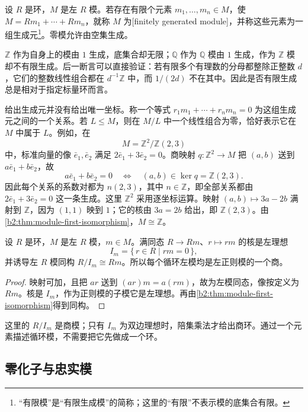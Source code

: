 \begin{definition}\label{b2:def:finitely-generated-module}
	设 \(R\) 是环，\(M\) 是左 \(R\) 模。若存在有限个元素 \(m_1,\ldots,m_n\in M\)，使 \(M=Rm_1+\cdots+Rm_n\)，就称 \(M\) 为[finitely generated module]，并称这些元素为一组生成元\footnote{“有限模”是“有限生成模”的简称；这里的“有限”不表示模的底集合有限。}。零模允许由空集生成。
\end{definition}

\(\mathbb Z\) 作为自身上的模由 \(1\) 生成，底集合却无限；\(\mathbb Q\) 作为 \(\mathbb Q\) 模由 \(1\) 生成，作为 \(\mathbb Z\) 模却不有限生成。后一断言可以直接验证：若有限多个有理数的分母都整除正整数 \(d\)，它们的整数线性组合都在 \(d^{-1}\mathbb Z\) 中，而 \(1/(2d)\) 不在其中。因此是否有限生成总是相对于指定标量环而言。

\ProseParagraphBreak
给出生成元并没有给出唯一坐标。称一个等式 \(r_1m_1+\cdots+r_nm_n=0\) 为这组生成元之间的一个关系。若 \(L\le M\)，则在 \(M/L\) 中一个线性组合为零，恰好表示它在 \(M\) 中属于 \(L\)。例如，在
\[
	M=\mathbb Z^2/\mathbb Z(2,3)
\]
中，标准向量的像 \(\bar e_1,\bar e_2\) 满足 \(2\bar e_1+3\bar e_2=0\)。商映射 \(q:\mathbb Z^2\to M\) 把 \((a,b)\) 送到 \(a\bar e_1+b\bar e_2\)，故
\[
	a\bar e_1+b\bar e_2=0 \quad\Longleftrightarrow\quad (a,b)\in\ker q=\mathbb Z(2,3).
\]
因此每个关系的系数对都为 \(n(2,3)\)，其中 \(n\in\mathbb Z\)，即全部关系都由 \(2\bar e_1+3\bar e_2=0\) 这一条生成。这里 \(\mathbb Z^2\) 采用逐坐标运算。映射 \((a,b)\mapsto3a-2b\) 满射到 \(\mathbb Z\)，因为 \((1,1)\) 映到 \(1\)；它的核由 \(3a=2b\) 给出，即 \(\mathbb Z(2,3)\)。由\cref{b2:thm:module-first-isomorphism}，\(M\cong\mathbb Z\)。

\begin{proposition}\label{b2:prop:cyclic-module-quotient}
	设 \(R\) 是环，\(M\) 是左 \(R\) 模，\(m\in M\)。满同态 \(R\to Rm\)、\(r\mapsto rm\) 的核是左理想
	\[
		I_m=\{\,r\in R\mid rm=0\,\},
	\]
	并诱导左 \(R\) 模同构 \(R/I_m\cong Rm\)。所以每个循环左模均是左正则模的一个商。
\end{proposition}
\begin{proof}
	映射可加，且把 \(ar\) 送到 \((ar)m=a(rm)\)，故为左模同态，像按定义为 \(Rm\)。核是 \(I_m\)，作为正则模的子模它是左理想。再由\cref{b2:thm:module-first-isomorphism}得到同构。
\end{proof}

这里的 \(R/I_m\) 是商模；只有 \(I_m\) 为双边理想时，陪集乘法才给出商环。通过一个元素描述循环模，不需要把它先做成一个环。

\subsection{零化子与忠实模}
\label{b2:subsec:0203:02}

